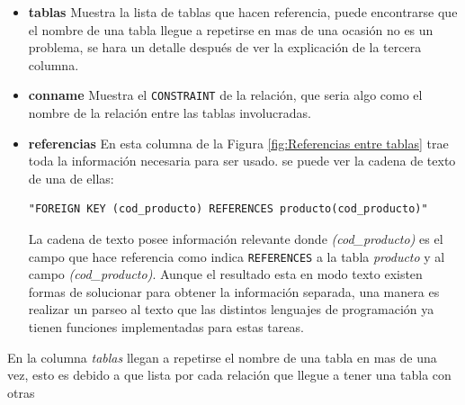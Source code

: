\begin{itemize}
\item \textbf{tablas} Muestra la lista de tablas que hacen referencia, puede encontrarse que el nombre de una tabla llegue a repetirse en mas de una ocasi\'on no es un problema, se hara un detalle despu\'es de ver la explicaci\'on de la tercera columna.   
\item \textbf{conname} Muestra el \texttt{CONSTRAINT} de la relaci\'on, que seria algo como el nombre de la relaci\'on entre las tablas involucradas. 
\item \textbf{referencias} En esta columna de la Figura \ref{fig:Referencias entre tablas} trae toda la informaci\'on necesaria para ser usado. se puede ver la cadena de texto de una de ellas:
\lstset{language=sql,breaklines=true}
\begin{lstlisting}
"FOREIGN KEY (cod_producto) REFERENCES producto(cod_producto)"
\end{lstlisting}
La cadena de texto posee informaci\'on relevante donde \emph{(cod\_producto)} es el campo que hace referencia como indica \texttt{REFERENCES} a la tabla \emph{producto} y al campo  \emph{(cod\_producto)}.
Aunque el resultado esta en modo texto existen formas de solucionar para obtener la informaci\'on separada, una manera es realizar un parseo al texto que las distintos lenguajes de programaci\'on ya tienen funciones implementadas para estas tareas. 
\end{itemize}
En la columna \emph{tablas} llegan a repetirse el nombre de una tabla en mas de una vez, esto es debido a que lista por cada relaci\'on que llegue a tener una tabla con otras
